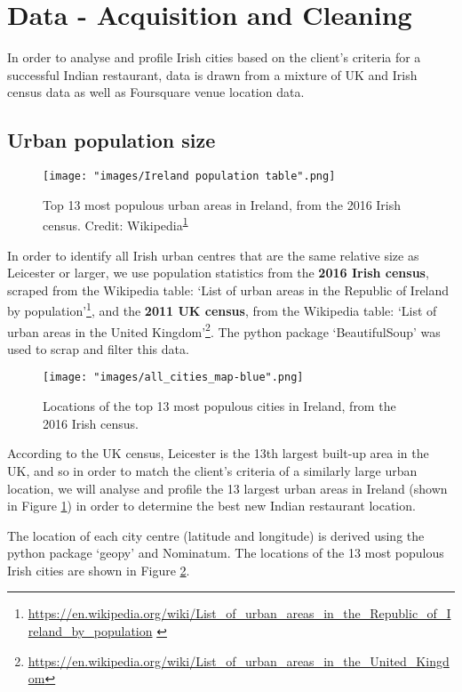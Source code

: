 \documentclass[a4paper,11pt]{article}
\begin{document}
\section{Data - Acquisition and Cleaning}\label{sec: data}
In order to analyse and profile Irish cities based on the client's criteria for a successful Indian restaurant, data is drawn from a mixture of UK and Irish census data as well as Foursquare venue location data.

\subsection{Urban population size}
\begin{figure}[htb]
   \centering
   \texttt{[image: "images/Ireland population table".png]}
      \caption{Top 13 most populous urban areas in Ireland, from the 2016 Irish census. Credit: Wikipedia\textsuperscript{\ref{footnote:irish pop}}}
      \label{fig:irish pop table}
\end{figure}
In order to identify all Irish urban centres that are the same relative size as Leicester or larger, we use population statistics from the \textbf{2016 Irish census}, scraped from the Wikipedia table: `List of urban areas in the Republic of Ireland by population'\footnote{\url{https://en.wikipedia.org/wiki/List_of_urban_areas_in_the_Republic_of_Ireland_by_population} \label{footnote:irish pop}}, and the \textbf{2011 UK census}, from the Wikipedia table: `List of urban areas in the United Kingdom'\footnote{\url{https://en.wikipedia.org/wiki/List_of_urban_areas_in_the_United_Kingdom}}. The python package `BeautifulSoup' was used to scrap and filter this data.
%
\begin{figure}[htb]
   \centering
   \texttt{[image: "images/all\_cities\_map-blue".png]}
      \caption{Locations of the top 13 most populous cities in Ireland, from the 2016 Irish census.}
      \label{fig:map all cities}
\end{figure}
%
According to the UK census, Leicester is the 13th largest built-up area in the UK, and so in order to match the client's criteria of a similarly large urban location, we will analyse and profile the 13 largest urban areas in Ireland (shown in Figure \ref{fig:irish pop table}) in order to determine the best new Indian restaurant location.

The location of each city centre (latitude and longitude) is derived using the python package `geopy' and Nominatum. The locations of the 13 most populous Irish cities are shown in Figure \ref{fig:map all cities}.
\end{document}
